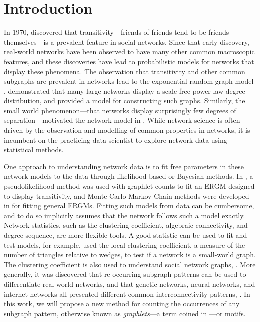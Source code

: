 
	\section{Introduction}
	\label{sec:intro}
	
    In 1970, \cite{davis1970clustering} discovered that transitivity---friends of friends tend to be friends themselves---is a prevalent feature in social networks.
    Since that early discovery, real-world networks have been observed to have many other common macroscopic features, and these discoveries have lead to probabilistic models for networks that display these phenomena.
    The observation that transitivity and other common subgraphs are prevalent in networks lead to the exponential random graph model \cite{frank1986markov}.
    \cite{barabasi1999emergence} demonstrated that many large networks display a scale-free power law degree distribution, and provided a model for constructing such graphs.
    Similarly, the small world phenomenon---that networks display surprisingly few degrees of separation---motivated the network model in \cite{watts1998collective}.
    While network science is often driven by the observation and modelling of common properties in networks, it is incumbent on the practicing data scientist to explore network data using statistical methods. 
    
    One approach to understanding network data is to fit free parameters in these network models to the data through likelihood-based or Bayesian methods. 
    In \cite{wasserman1996logit}, a pseudolikelihood method was used with graphlet counts to fit an ERGM designed to display transitivity, and Monte Carlo Markov Chain methods were developed in \cite{snijders2002markov} for fitting general ERGMs.
	Fitting such models from data can be cumbersome, and to do so implicitly assumes that the network follows such a model exactly.
	Network statistics, such as the clustering coefficient, algebraic connectivity, and degree sequence, are more flexible tools.
	A good statistic can be used to fit and test models, for example, \cite{watts1998collective} used the local clustering coefficient, a measure of the number of triangles relative to wedges, to test if a network is a small-world graph.
	The clustering coefficient is also used to understand social network graphs, \cite{chakrabarti2006graph}.
	More generally, it was discovered that re-occurring subgraph patterns can be used to differentiate real-world networks, and that genetic networks, neural networks, and internet networks all presented different common interconnectivity patterns, \cite{milo2002network}.
	In this work, we will propose a new method for counting the occurrences of any subgraph pattern, otherwise known as {\em graphlets}---a term coined in \cite{prvzulj2004modeling}---or motifs.
	
